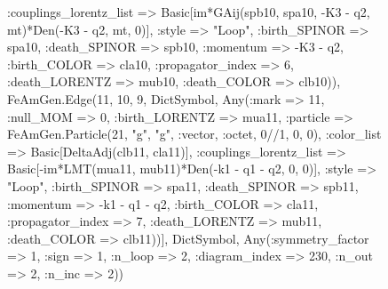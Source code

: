 \documentclass{revtex4}
\begin{document}
\begin{figure}[!htb]
\begin{center}
{:couplings_lorentz_list => Basic[im*GAij(spb10, spa10, -K3 - q2, mt)*Den(-K3 - q2, mt, 0)], :style => "Loop", :birth_SPINOR => spa10, :death_SPINOR => spb10, :momentum => -K3 - q2, :birth_COLOR => cla10, :propagator_index => 6, :death_LORENTZ => mub10, :death_COLOR => clb10)), FeAmGen.Edge(11, 10, 9, Dict{Symbol, Any}(:mark => 11, :null_MOM => 0, :birth_LORENTZ => mua11, :particle => FeAmGen.Particle(21, "g", "g", :vector, :octet, 0//1, 0, 0), :color_list => Basic[DeltaAdj(clb11, cla11)], :couplings_lorentz_list => Basic[-im*LMT(mua11, mub11)*Den(-k1 - q1 - q2, 0, 0)], :style => "Loop", :birth_SPINOR => spa11, :death_SPINOR => spb11, :momentum => -k1 - q1 - q2, :birth_COLOR => cla11, :propagator_index => 7, :death_LORENTZ => mub11, :death_COLOR => clb11))], Dict{Symbol, Any}(:symmetry_factor => 1, :sign => 1, :n_loop => 2, :diagram_index => 230, :n_out => 2, :n_inc => 2)) 
}
\end{center}
\end{figure}
\end{document}
